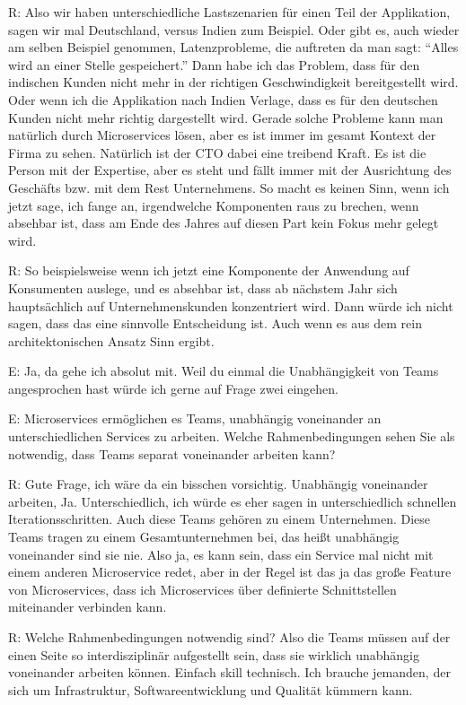 R: Also wir haben unterschiedliche Lastszenarien für einen Teil der Applikation, sagen wir mal Deutschland, versus Indien zum Beispiel. Oder gibt es, auch wieder am selben Beispiel genommen, Latenzprobleme, die auftreten da man sagt: “Alles wird an einer Stelle gespeichert.” Dann habe ich das Problem, dass für den indischen Kunden nicht mehr in der richtigen Geschwindigkeit bereitgestellt wird. Oder wenn ich die Applikation nach Indien Verlage, dass es für den deutschen Kunden nicht mehr richtig dargestellt wird. Gerade solche Probleme kann man natürlich durch Microservices lösen, aber es ist immer im gesamt Kontext der Firma zu sehen. Natürlich ist der CTO dabei eine treibend Kraft. Es ist die Person mit der Expertise, aber es steht und fällt immer mit der Ausrichtung des Geschäfts bzw. mit dem Rest Unternehmens. So macht es keinen Sinn, wenn ich jetzt sage, ich fange an, irgendwelche Komponenten raus zu brechen, wenn absehbar ist, dass am Ende des Jahres auf diesen Part kein Fokus mehr gelegt wird.

R: So beispielsweise wenn ich jetzt eine Komponente der Anwendung auf Konsumenten auslege, und es absehbar ist, dass ab nächstem Jahr sich hauptsächlich auf Unternehmenskunden konzentriert wird. Dann würde ich nicht sagen, dass das eine sinnvolle Entscheidung ist. Auch wenn es aus dem rein architektonischen Ansatz Sinn ergibt.

E: Ja, da gehe ich absolut mit. Weil du einmal die Unabhängigkeit von Teams angesprochen hast würde ich gerne auf Frage zwei eingehen.

E: Microservices ermöglichen es Teams, unabhängig voneinander an unterschiedlichen Services zu arbeiten. Welche Rahmenbedingungen sehen Sie als notwendig, dass Teams separat voneinander arbeiten kann?

R: Gute Frage, ich wäre da ein bisschen vorsichtig. Unabhängig voneinander arbeiten, Ja. Unterschiedlich, ich würde es eher sagen in unterschiedlich schnellen Iterationsschritten. Auch diese Teams gehören zu einem Unternehmen. Diese Teams tragen zu einem Gesamtunternehmen bei, das heißt unabhängig voneinander sind sie nie.
Also ja, es kann sein, dass ein Service mal nicht mit einem anderen Microservice redet, aber in der Regel ist das ja das große Feature von Microservices, dass ich Microservices über definierte Schnittstellen miteinander verbinden kann.

R: Welche Rahmenbedingungen notwendig sind? Also die Teams müssen auf der einen Seite so interdisziplinär aufgestellt sein, dass sie wirklich unabhängig voneinander arbeiten können. Einfach skill technisch. Ich brauche jemanden, der sich um Infrastruktur, Softwareentwicklung und Qualität kümmern kann.

